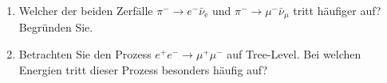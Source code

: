 \begin{enumerate}
    \item Welcher der beiden Zerfälle $\pi^- \to e^- \bar{\nu}_{\text{e}}$ und $\pi^- \to \mu^- \bar{\nu}_{\mu}$ tritt häufiger auf? Begründen Sie.

    \item Betrachten Sie den Prozess $e^+ e^- \to \mu^+ \mu^-$ auf Tree-Level. Bei welchen Energien tritt dieser Prozess besonders häufig auf? 

\end{enumerate}